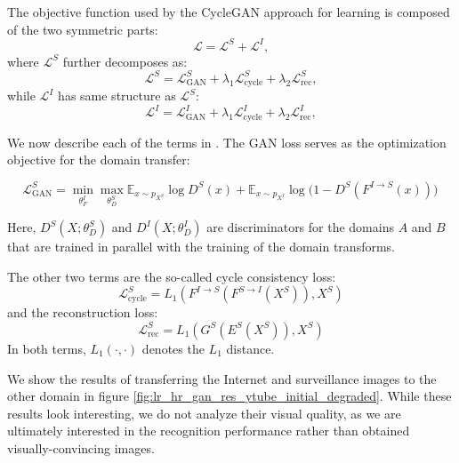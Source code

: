 The objective function used by the CycleGAN approach for learning is composed of the two symmetric parts:
\begin{equation}
\mathcal{L} = \mathcal{L}^{S} + \mathcal{L}^{I},
\end{equation} where $\mathcal{L}^{S}$ further decomposes as:
\begin{equation}\label{eq:domain_loss}
     \mathcal{L}^{S} = \mathcal{L}_{\text{GAN}}^S + \lambda_1 \mathcal{L}_{\text{cycle}}^S + \lambda_2 \mathcal{L}_{\text{rec}}^S,
\end{equation}
while $\mathcal{L}^{I}$ has same structure as $\mathcal{L}^{S}$:
\begin{equation}\label{eq:domain_loss2}
     \mathcal{L}^{I} = \mathcal{L}_{\text{GAN}}^I + \lambda_1 \mathcal{L}_{\text{cycle}}^I + \lambda_2 \mathcal{L}_{\text{rec}}^I,
\end{equation}


We now describe each of the terms in .
The GAN loss serves as the optimization objective for the domain transfer: 

\begin{dmath}
\mathcal{L}_{\text{GAN}}^S = 
    \min_{\theta^{I}_F} \max_{\theta^{S}_D} \mathbb{E}_{x \sim p_{X^{S}}} \log D^{S}(x) +
    \mathbb{E}_{x \sim p_{X^{I}}} \log \big(1 - D^{S}(F^{I \rightarrow S}(x)) \big)\,
\end{dmath}


Here, $D^{S}(X;\theta^{S}_D)$ and $D^{I}(X;\theta^{I}_D)$ are discriminators for the domains $A$ and $B$ that are trained in parallel with the training of the domain transforms.

The other two terms are the so-called cycle consistency loss: 
\begin{equation}
\mathcal{L}_{\text{cycle}}^S = L_1(F^{I \rightarrow S}(F^{S \rightarrow I}(X^{S})), X^{S})  
\end{equation}
and the reconstruction loss:
\begin{equation}
\mathcal{L}_{\text{rec}}^S = L_1(G^{S}(E^{S}(X^{S})), X^{S}) 
\end{equation}
In both terms, $L_1(\cdot,\cdot)$ denotes the $L_1$ distance.

We show the results of transferring the Internet and surveillance images to the other domain in figure \ref{fig:lr_hr_gan_res_ytube_initial_degraded}. While these results look interesting, we do not analyze their visual quality, as we are ultimately interested in the recognition performance rather than obtained visually-convincing images.

